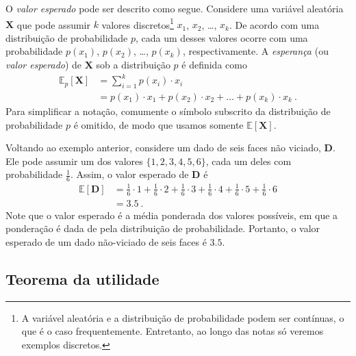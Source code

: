 \documentclass{article}
\newcommand*{\RandomVariable}[1]{\mathbf{#1}}
\newcommand*{\ExpectedValue}{\mathbb{E}}
\begin{document}
            O \emph{valor esperado} pode ser descrito como segue. Considere uma variável aleatória $\RandomVariable{X}$ que pode assumir $k$ valores discretos\footnote{A variável aleatória e a distribuição de probabilidade podem ser contínuas, o que é o caso frequentemente. Entretanto, ao longo das notas só veremos exemplos discretos.} $x_1$, $x_2$, \dots, $x_k$. De acordo com uma distribuição de probabilidade $p$, cada um desses valores ocorre com uma probabilidade $p(x_1)$, $p(x_2)$, \dots, $p(x_k)$, respectivamente. A \emph{esperança} (ou \emph{valor esperado}) de $\RandomVariable{X}$ sob a distribuição $p$ é definida como
            \begin{equation}
            \begin{aligned}
                \label{eq:state-value}
                \ExpectedValue_p[\RandomVariable{X}] & = \sum_{i=1}^k p(x_i) \cdot x_i \\
                & = p(x_1) \cdot x_1 + p(x_2) \cdot x_2 + \dots + p(x_k) \cdot x_k\ .
            \end{aligned}
            \end{equation}
            Para simplificar a notação, comumente o símbolo subscrito da distribuição de probabilidade $p$ é omitido, de modo que usamos somente $\ExpectedValue[\RandomVariable{X}]$.
    
            Voltando ao exemplo anterior, considere um dado de seis faces não viciado, $\RandomVariable{D}$. Ele pode assumir um dos valores $\{1, 2, 3, 4, 5, 6\}$, cada um deles com probabilidade $\frac{1}{6}$. Assim, o valor esperado de $\RandomVariable{D}$ é
            \begin{equation*}
            \begin{aligned}
                \ExpectedValue[\RandomVariable{D}] & = \frac{1}{6} \cdot 1 + \frac{1}{6} \cdot 2 + \frac{1}{6} \cdot 3 + \frac{1}{6} \cdot 4 + \frac{1}{6} \cdot 5 + \frac{1}{6} \cdot 6 \\
                & = 3.5\ .
            \end{aligned}
            \end{equation*}        
            Note que o valor esperado é a média ponderada dos valores possíveis, em que a ponderação é dada de pela distribuição de probabilidade. Portanto, o valor esperado de um dado não-viciado de seis faces é $3.5$.
        
        \subsection{Teorema da utilidade}
        
\end{document}
